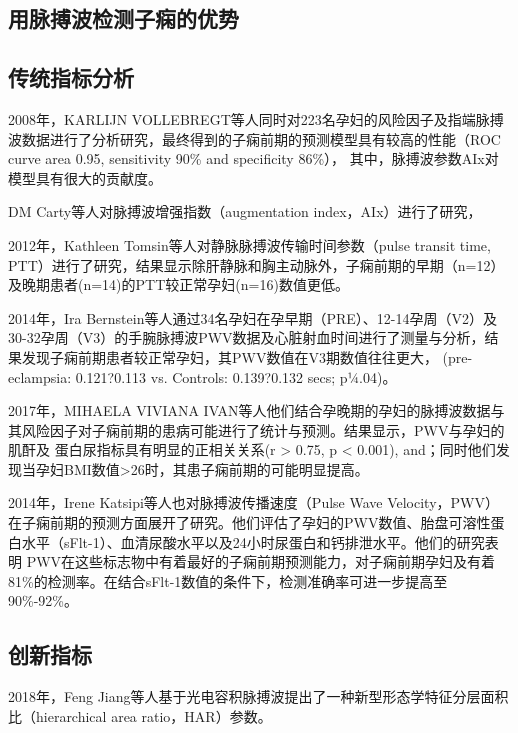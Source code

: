 \subsection{用脉搏波检测子痫的优势}

\subsection{传统指标分析}

2008年，KARLIJN VOLLEBREGT等人\cite{KARLIJN2008}同时对223名孕妇的风险因子及指端脉搏波数据进行了分析研究，最终得到的子痫前期的预测模型具有较高的性能（ROC curve area 0.95, sensitivity 90\% and specificity 86\%），
其中，脉搏波参数AIx对模型具有很大的贡献度。

DM Carty等人对脉搏波增强指数（augmentation index，AIx）进行了研究，

2012年，Kathleen Tomsin等人\cite{Tomsin2012}对静脉脉搏波传输时间参数（pulse transit time, PTT）进行了研究，结果显示除肝静脉和胸主动脉外，子痫前期的早期（n=12）及晚期患者(n=14)的PTT较正常孕妇(n=16)数值更低。

2014年，Ira Bernstein等\cite{Ira2014}人通过34名孕妇在孕早期（PRE）、12-14孕周（V2）及30-32孕周（V3）的手腕脉搏波PWV数据及心脏射血时间进行了测量与分析，结果发现子痫前期患者较正常孕妇，其PWV数值在V3期数值往往更大，
(pre- eclampsia: 0.121?0.113 vs. Controls: 0.139?0.132 secs; p¼.04)。

2017年，MIHAELA VIVIANA IVAN等人\cite{VivianaIvan2018}他们结合孕晚期的孕妇的脉搏波数据与其风险因子对子痫前期的患病可能进行了统计与预测。结果显示，PWV与孕妇的肌酐及
蛋白尿指标具有明显的正相关关系(r > 0.75, p < 0.001), and；同时他们发现当孕妇BMI数值>26时，其患子痫前期的可能明显提高。

2014年，Irene Katsipi等人\cite{Katsipi2014}也对脉搏波传播速度（Pulse Wave Velocity，PWV）在子痫前期的预测方面展开了研究。他们评估了孕妇的PWV数值、胎盘可溶性蛋白水平（sFlt-1）、血清尿酸水平以及24小时尿蛋白和钙排泄水平。他们的研究表明
PWV在这些标志物中有着最好的子痫前期预测能力，对子痫前期孕妇及有着81\%的检测率。在结合sFlt-1数值的条件下，检测准确率可进一步提高至90\%-92\%。



\subsection{创新指标}

2018年，Feng Jiang等人基于光电容积脉搏波提出了一种新型形态学特征分层面积比（hierarchical area ratio，HAR）参数。

